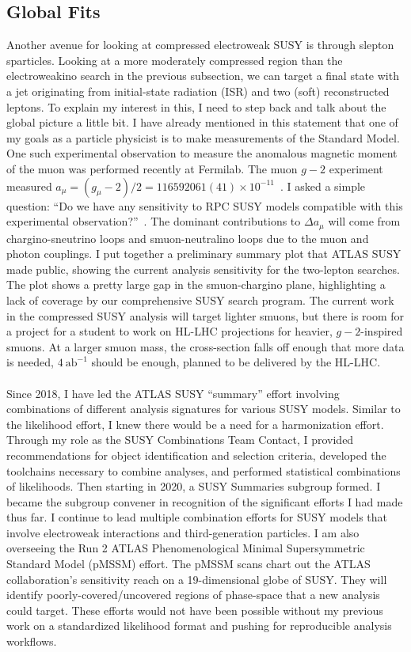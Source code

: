 \documentclass[10pt,a4paper,sans]{moderncv/moderncv} %
\begin{document}
\subsection{Global Fits}
Another avenue for looking at compressed electroweak SUSY is through slepton sparticles. Looking at a more moderately compressed region than the electroweakino search in the previous subsection, we can target a final state with a jet originating from initial-state radiation (ISR) and two (soft) reconstructed leptons. To explain my interest in this, I need to step back and talk about the global picture a little bit. I have already mentioned in this statement that one of my goals as a particle physicist is to make measurements of the Standard Model. One such experimental observation to measure the anomalous magnetic moment of the muon was performed recently at Fermilab. The muon $g-2$ experiment measured $a_\mu = (g_\mu-2)/2 = 116 592 061 (41) \times 10^{-11}$~\cite{PhysRevLett.126.141801}. I asked a simple question: ``Do we have any sensitivity to RPC SUSY models compatible with this experimental observation?''~\cite{Chakraborti:2021dli}. The dominant contributions to $\Delta a_\mu$ will come from chargino-sneutrino loops and smuon-neutralino loops due to the muon and photon couplings. I put together a preliminary summary plot that ATLAS SUSY made public, showing the current analysis sensitivity for the two-lepton searches. The plot shows a pretty large gap in the smuon-chargino plane, highlighting a lack of coverage by our comprehensive SUSY search program. The current work in the compressed SUSY analysis will target lighter smuons, but there is room for a project for a student to work on HL-LHC projections for heavier, $g-2$-inspired smuons. At a larger smuon mass, the cross-section falls off enough that more data is needed, $4\ \mathrm{ab}^{-1}$ should be enough, planned to be delivered by the HL-LHC.
\\
\\
Since 2018, I have led the ATLAS SUSY ``summary'' effort involving combinations of different analysis signatures for various SUSY models. Similar to the likelihood effort, I knew there would be a need for a harmonization effort. Through my role as the SUSY Combinations Team Contact, I provided recommendations for object identification and selection criteria, developed the toolchains necessary to combine analyses, and performed statistical combinations of likelihoods. Then starting in 2020, a SUSY Summaries subgroup formed. I became the subgroup convener in recognition of the significant efforts I had made thus far. I continue to lead multiple combination efforts for SUSY models that involve electroweak interactions and third-generation particles. I am also overseeing the Run 2 ATLAS Phenomenological Minimal Supersymmetric Standard Model (pMSSM) effort. The pMSSM scans chart out the ATLAS collaboration's sensitivity reach on a 19-dimensional globe of SUSY. They will identify poorly-covered/uncovered regions of phase-space that a new analysis could target. These efforts would not have been possible without my previous work on a standardized likelihood format and pushing for reproducible analysis workflows.
\end{document}
